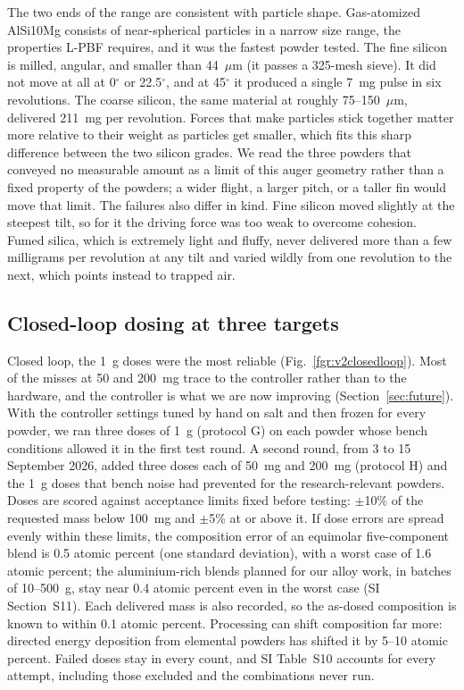 \documentclass[twoside,twocolumn,9pt]{article}
\begin{document}
The two ends of the range are consistent with particle shape. Gas-atomized AlSi10Mg consists of near-spherical particles in a narrow size range, the properties L-PBF requires, and it was the fastest powder tested. The fine silicon is milled, angular, and smaller than 44~$\mu$m (it passes a 325-mesh sieve). It did not move at all at 0$^\circ$ or 22.5$^\circ$, and at 45$^\circ$ it produced a single 7~mg pulse in six revolutions. The coarse silicon, the same material at roughly 75--150~$\mu$m, delivered 211~mg per revolution. Forces that make particles stick together matter more relative to their weight as particles get smaller, which fits this sharp difference between the two silicon grades. We read the three powders that conveyed no measurable amount as a limit of this auger geometry rather than a fixed property of the powders; a wider flight, a larger pitch, or a taller fin would move that limit. The failures also differ in kind. Fine silicon moved slightly at the steepest tilt, so for it the driving force was too weak to overcome cohesion. Fumed silica, which is extremely light and fluffy, never delivered more than a few milligrams per revolution at any tilt and varied wildly from one revolution to the next, which points instead to trapped air.

\subsection{Closed-loop dosing at three targets}
\label{sec:closedloop}

Closed loop, the 1~g doses were the most reliable (Fig.~\ref{fgr:v2closedloop}). Most of the misses at 50 and 200~mg trace to the controller rather than to the hardware, and the controller is what we are now improving (Section~\ref{sec:future}). With the controller settings tuned by hand on salt and then frozen for every powder, we ran three doses of 1~g (protocol G) on each powder whose bench conditions allowed it in the first test round. A second round, from 3 to 15 September 2026, added three doses each of 50~mg and 200~mg (protocol H) and the 1~g doses that bench noise had prevented for the research-relevant powders. Doses are scored against acceptance limits fixed before testing: $\pm$10\% of the requested mass below 100~mg and $\pm$5\% at or above it. If dose errors are spread evenly within these limits, the composition error of an equimolar five-component blend\cite{Vecchio2021Throughput,Moorehead2020Throughput} is 0.5 atomic percent (one standard deviation), with a worst case of 1.6 atomic percent; the aluminium-rich blends planned for our alloy work, in batches of 10--500~g, stay near 0.4 atomic percent even in the worst case (SI Section~S11). Each delivered mass is also recorded, so the as-dosed composition is known to within 0.1 atomic percent. Processing can shift composition far more: directed energy deposition from elemental powders has shifted it by 5--10 atomic percent.\cite{Moorehead2020Throughput,Chen2020Elemental} Failed doses stay in every count, and SI Table~S10 accounts for every attempt, including those excluded and the combinations never run.
\end{document}
